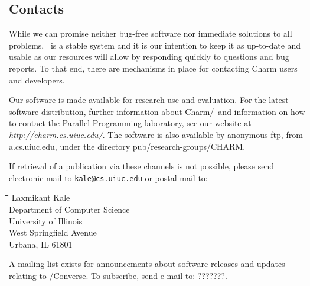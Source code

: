 \subsection{Contacts}
\label{Distribution}

While we can promise neither bug-free software nor immediate solutions   
to all problems, \charmpp\ is a stable system and it is our intention to
keep it as up-to-date and usable as our resources will allow
by responding quickly to questions and bug reports.  To that
end, there are mechanisms in place for contacting Charm users
and developers. 

Our software is made available for research use and evaluation.
For the latest software distribution, further information about {\sc
Charm}/\charmpp\ and information on how to contact the Parallel
Programming laboratory, see our website at {\it
http://charm.cs.uiuc.edu/}.  The software is also available by
anonymous ftp, from a.cs.uiuc.edu, under the directory
pub/research-groups/CHARM.  

If retrieval of a publication via these channels is not possible,
please send electronic mail to {\tt kale@cs.uiuc.edu} or postal mail to:

{\bf 
\begin{tabbing}
\hspace{0.5in}\=\hspace{0.3in}\=\hspace{0.3in}\=\hspace{0.3in}\= \kill
\> Laxmikant Kale \\
\> Department of Computer Science \\
\> University of Illinois \\
 West Springfield Avenue \\
\> Urbana, IL 61801 \\
\end{tabbing}
}

A mailing list exists for announcements about software releases and
updates relating to \charmpp/{\sc Converse}.  To subscribe, send
e-mail to: ???????.
